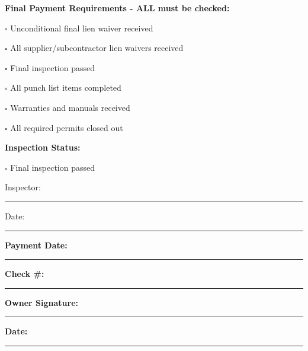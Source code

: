 \documentclass[11pt,letterpaper]{article}
\begin{document}
\vspace{6pt}

\textbf{Final Payment Requirements - ALL must be checked:}

$\square$ Unconditional final lien waiver received

$\square$ All supplier/subcontractor lien waivers received

$\square$ Final inspection passed

$\square$ All punch list items completed

$\square$ Warranties and manuals received

$\square$ All required permits closed out

\textbf{Inspection Status:}

$\square$ Final inspection passed

Inspector: \rule{5cm}{0.4pt} Date: \rule{3cm}{0.4pt}

\textbf{Payment Date:} \rule{4cm}{0.4pt} \hspace{0.3in} \textbf{Check \#:} \rule{3cm}{0.4pt}

\textbf{Owner Signature:} \rule{5cm}{0.4pt} \textbf{Date:} \rule{2cm}{0.4pt}
\end{document}
